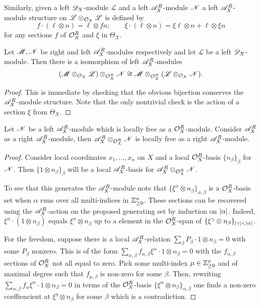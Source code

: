 Similarly, given a left $\mathscr{D}_X$-module $\mathscr{L}$ and a left $\mathscr{A}_X^R$-module $\mathscr{N}$ a left $\mathscr{A}_X^R$-module structure on $\mathscr{L} \otimes_{\mathcal{O}_X} \mathscr{L}$ is defined by
$$f \cdot (\ell\otimes n) =\ell \otimes fn; \qquad \xi \cdot (\ell\otimes n ) = \xi \ell \otimes n + \ell \otimes \xi n$$
for any sections $f$ of $\mathcal{O}_X^R$ and $\xi$ in $\Theta_X$.

\begin{lemma}\label{lem: IsomorphismTensors}
  Let $\mathscr{M}, \mathscr{N}$ be right and left $\mathscr{A}_X^R$-modules respectively and let $\mathscr{L}$ be a left $\mathscr{D}_X$-module. Then there is a isomorphism of left $\mathscr{A}_X^R$-modules
  $$(\mathscr{M} \otimes_{\mathcal{O}_X} \mathscr{L})\otimes_{\mathcal{O}_X^R} \mathscr{N} \cong \mathscr{M} \otimes_{\mathcal{O}_X^R} (\mathscr{L}\otimes_{\mathcal{O}_X} \mathscr{N}).   $$
\end{lemma}
\begin{proof}
  This is immediate by checking that the obvious bijection conserves the $\mathscr{A}_X^R$-module structure. Note that the only nontrivial check is the action of a section $\xi$ from $\Theta_X$.
\end{proof}
\begin{lemma}\label{lem: FreeLeftAModuleTensor}
  Let $\mathscr{N}$ be a left $\mathscr{A}_X^R$-module which is locally free as a $\mathcal{O}_X^R$-module. Consider $\mathscr{A}_X^R$ as a right $\mathscr{A}_X^R$-module, then $\mathscr{A}_X^R \otimes_{\mathcal{O}_X^R} \mathscr{N}$ is locally free as a right $\mathscr{A}_X^R$-module.
\end{lemma}
\begin{proof}
  Consider local coordinates $x_1,\ldots, x_n$ on $X$ and a local $\mathcal{O}_X^R$-basis $\{n_\beta\}_\beta$ for $\mathscr{N}$. Then $\{1\otimes n_\beta\}_{\beta}$ will be a local $\mathscr{A}_X^R$-basis for $\mathscr{A}_X^R \otimes_{\mathcal{O}_X^R} \mathscr{N}$.

  To see that this generates the $\mathscr{A}_X^R$-module note that $\{\xi^\alpha \otimes n_\beta\}_{\alpha,\beta}$
  is a $\mathcal{O}_X^R$-basis set when $\alpha$ runs over all multi-indices in $\mathbb{Z}_{\geq 0}^n$.
  These sections can be recovered using the $\mathscr{A}_X^R$-action on the proposed generating set by induction on $\vert \alpha \vert$.
  Indeed, $\xi^\alpha \cdot (1 \otimes n_\beta)$ equals $\xi^\alpha \otimes n_\beta$ up to a element in the $\mathcal{O}_X^R$-span of $\{\xi^\gamma \otimes n_\beta\}_{\vert \gamma \vert<\vert \alpha \vert}$.

  For the freedom, suppose there is a local $\mathscr{A}_X^R$-relation $\sum_\beta P_\beta \cdot 1\otimes n_\beta = 0$ with some $P_\beta$ nonzero. This is of the form $\sum_{\alpha, \beta} f_{\alpha,\beta} \xi^\alpha \cdot 1\otimes n_\beta = 0$ with the $f_{\alpha,\beta}$ sections of $\mathcal{O}_X^R$ not all equal to zero.
  Pick some multi-index $\mu\in \mathbb{Z}_{\geq 0}^n$ and of maximal degree such that $f_{\mu,\beta}$ is non-zero for some $\beta$.
  Then, rewriting $\sum_{\alpha, \beta} f_\alpha \xi^\alpha \cdot 1\otimes n_\beta = 0$ in terms of the $\mathcal{O}_X^R$-basis $\{\xi^\alpha \otimes n_\beta\}_{\alpha,\beta}$ one finds a non-zero coeffiencient at $\xi^\eta \otimes n_\beta$ for some $\beta$ which is a contradiction.
\end{proof}

